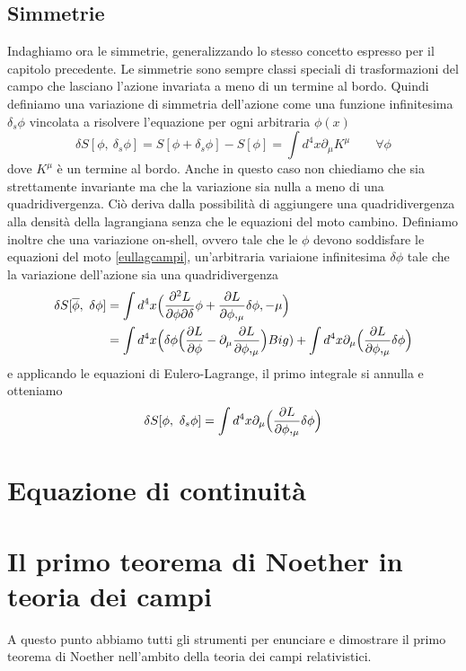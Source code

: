 \subsection{Simmetrie}
    Indaghiamo ora le simmetrie, generalizzando lo stesso concetto espresso per il capitolo precedente. Le simmetrie sono sempre classi speciali di trasformazioni del campo che lasciano l'azione invariata a meno di un termine al bordo. Quindi definiamo una variazione di simmetria dell'azione come una funzione infinitesima $\delta_s \phi$ vincolata a risolvere l'equazione per ogni arbitraria $\phi(x)$
\begin{equation} \label{invazionecampi}
    \delta S[\phi, ~\delta_s \phi] = S[\phi + \delta_s \phi] - S[\phi] = \int d^4 x \partial_\mu K^\mu \qquad \forall \phi
\end{equation}  
    dove $K^\mu$ è un termine al bordo. Anche in questo caso non chiediamo che sia strettamente invariante ma che la variazione sia nulla a meno di una quadridivergenza. Ciò deriva dalla possibilità di aggiungere una quadridivergenza alla densità della lagrangiana senza che le equazioni del moto cambino. Definiamo inoltre che una variazione on-shell, ovvero tale che le $\phi$ devono soddisfare le equazioni del moto \eqref{eullagcampi}, un'arbitraria variaione infinitesima $\delta \phi$ tale che la variazione dell'azione sia una quadridivergenza
\begin{equation}
\begin{aligned}
    \delta S[\overline \phi, ~\delta \phi] & = \int d^4 x \Big(\frac{\partial^2 L}{\partial\phi \partial\delta} \phi + \frac{\partial L}{\partial\phi,_\mu} \delta \phi,-\mu \Big) \\ & = \int d^4 x \Big ( \delta \phi \Big (\frac{\partial L}{\partial\phi} - \partial_\mu \frac{\partial L}{\partial\phi,_\mu} \Big ) Big) + \int d^4 x \partial_\mu \Big ( \frac{\partial L}{\partial\phi,_\mu}  \delta \phi \Big)
\end{aligned}
\end{equation}
    e applicando le equazioni di Eulero-Lagrange, il primo integrale si annulla e otteniamo 
\begin{equation} \label{invonshellcampi}
    \delta S[\phi, ~\delta_s \phi] = \int d^4 x \partial_\mu \Big ( \frac{\partial L}{\partial\phi,_\mu}  \delta \phi \Big)
\end{equation}

\section{Equazione di continuità}

\section{Il primo teorema di Noether in teoria dei campi}
    A questo punto abbiamo tutti gli strumenti per enunciare e dimostrare il primo teorema di Noether nell'ambito della teoria dei campi relativistici.


